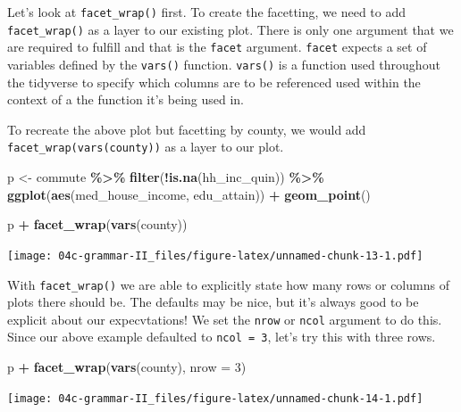 \documentclass[
]{book}
\newenvironment{Shaded}{\begin{snugshade}}{\end{snugshade}}
\newcommand{\DataTypeTok}[1]{\textcolor[rgb]{0.13,0.29,0.53}{#1}}
\newcommand{\DecValTok}[1]{\textcolor[rgb]{0.00,0.00,0.81}{#1}}
\newcommand{\KeywordTok}[1]{\textcolor[rgb]{0.13,0.29,0.53}{\textbf{#1}}}
\newcommand{\NormalTok}[1]{#1}
\newcommand{\OperatorTok}[1]{\textcolor[rgb]{0.81,0.36,0.00}{\textbf{#1}}}
\newcommand{\StringTok}[1]{\textcolor[rgb]{0.31,0.60,0.02}{#1}}
\begin{document}
Let's look at \texttt{facet\_wrap()} first. To create the facetting, we need to add \texttt{facet\_wrap()} as a layer to our existing plot. There is only one argument that we are required to fulfill and that is the \texttt{facet} argument. \texttt{facet} expects a set of variables defined by the \texttt{vars()} function. \texttt{vars()} is a function used throughout the tidyverse to specify which columns are to be referenced used within the context of a the function it's being used in.

To recreate the above plot but facetting by county, we would add \texttt{facet\_wrap(vars(county))} as a layer to our plot.

\begin{Shaded}
\begin{Highlighting}[]
\NormalTok{p \textless{}{-}}\StringTok{ }\NormalTok{commute }\OperatorTok{\%\textgreater{}\%}\StringTok{ }
\StringTok{  }\KeywordTok{filter}\NormalTok{(}\OperatorTok{!}\KeywordTok{is.na}\NormalTok{(hh\_inc\_quin)) }\OperatorTok{\%\textgreater{}\%}\StringTok{ }
\StringTok{  }\KeywordTok{ggplot}\NormalTok{(}\KeywordTok{aes}\NormalTok{(med\_house\_income, edu\_attain)) }\OperatorTok{+}
\StringTok{  }\KeywordTok{geom\_point}\NormalTok{() }

\NormalTok{p }\OperatorTok{+}
\StringTok{  }\KeywordTok{facet\_wrap}\NormalTok{(}\KeywordTok{vars}\NormalTok{(county))}
\end{Highlighting}
\end{Shaded}

\texttt{[image: 04c-grammar-II\_files/figure-latex/unnamed-chunk-13-1.pdf]}

With \texttt{facet\_wrap()} we are able to explicitly state how many rows or columns of plots there should be. The defaults may be nice, but it's always good to be explicit about our expecvtations! We set the \texttt{nrow} or \texttt{ncol} argument to do this. Since our above example defaulted to \texttt{ncol\ =\ 3}, let's try this with three rows.

\begin{Shaded}
\begin{Highlighting}[]
\NormalTok{p }\OperatorTok{+}
\StringTok{  }\KeywordTok{facet\_wrap}\NormalTok{(}\KeywordTok{vars}\NormalTok{(county), }\DataTypeTok{nrow =} \DecValTok{3}\NormalTok{)}
\end{Highlighting}
\end{Shaded}

\texttt{[image: 04c-grammar-II\_files/figure-latex/unnamed-chunk-14-1.pdf]}
\end{document}
